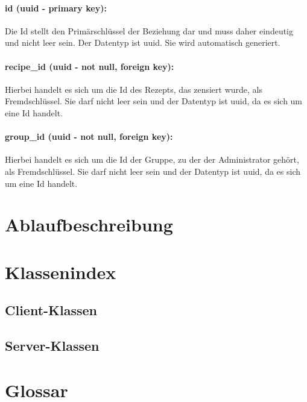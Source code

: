 \documentclass[parskip=full]{scrartcl}
\begin{document}
\paragraph{id (uuid - primary key):} Die Id stellt den Primärschlüssel der Beziehung dar und muss daher eindeutig und nicht leer sein. Der Datentyp ist \Gls{uuid}. Sie wird automatisch generiert.
\paragraph{recipe\_id (uuid - not null, foreign key):} Hierbei handelt es sich um die Id des Rezepts, das zensiert wurde, als Fremdschlüssel. Sie darf nicht leer sein und der Datentyp ist \Gls{uuid}, da es sich um eine Id handelt.
\paragraph{group\_id (uuid - not null, foreign key):} Hierbei handelt es sich um die Id der Gruppe, zu der der Administrator gehört, als Fremdschlüssel. Sie darf nicht leer sein und der Datentyp ist \Gls{uuid}, da es sich um eine Id handelt.
\newpage

\section{Ablaufbeschreibung}

\section{Klassenindex}
\subsection{Client-Klassen}
\subsection{Server-Klassen}

\section{Glossar}
\printglossary[style=altlist]
\end{document}
